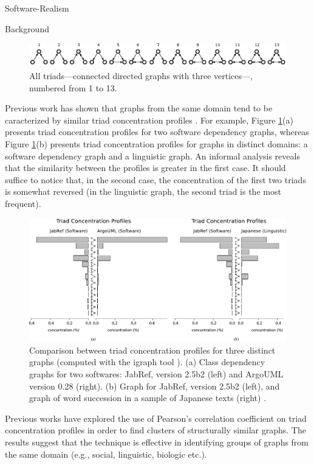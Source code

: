 \documentclass[11pt,twocolumn,a4paper,english]{article}
\begin{document}
\begin{section}{Software-Realism}
\begin{subsection}{Background}
	\begin{figure}[htbp]
		\centering
			\includegraphics[scale=1]{figures/triads}
		\caption{All triads---connected directed graphs with three vertices---, numbered from 1 to 13.}
		\label{fig:triads}
	\end{figure}
	
	Previous work has shown that graphs from the same domain tend to be caracterized by similar triad concentration profiles \cite{Milo2002}. For example, Figure \ref{fig:triads}(a) presents triad concentration profiles for two software dependency graphs, whereas Figure \ref{fig:triads}(b) presents triad concentration profiles for graphs in distinct domains: a software dependency graph and a linguistic graph. An informal analysis reveals that the similarity between the profiles is greater in the first case. It should suffice to notice that, in the second case, the concentration of the first two triads is somewhat reversed (in the linguistic graph, the second triad is the most frequent).

	\begin{figure}[htbp]
		\centering
			\includegraphics[scale=1]{figures/tcp}
		\caption{Comparison between triad concentration profiles for three distinct graphs (computed with the igraph tool \cite{igraph}). (a) Class dependency graphs for two softwares: JabRef, version 2.5b2 (left) and ArgoUML version 0.28 (right). (b) Graph for JabRef, version 2.5b2 (left), and graph of word succession in a sample of Japanese texts (right) \cite{Milo2004}.}
		\label{fig:tcp}
	\end{figure}
	
	Previous works \cite{Milo2004,Ma2007,Lin2008} have explored the use of Pearson's correlation coefficient on triad concentration profiles in order to find clusters of structurally similar graphs. The results suggest that the technique is effective in identifying groups of graphs from the same domain (e.g., social, linguistic, biologic etc.).
			

\end{subsection}
\end{section}
\end{document}
